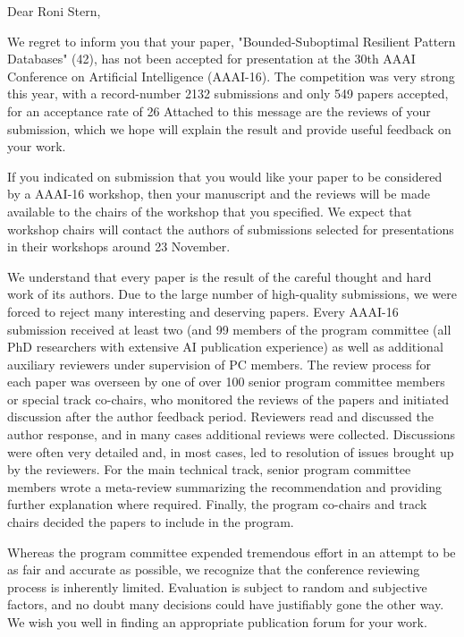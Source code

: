 Dear Roni Stern,

We regret to inform you that your paper, "Bounded-Suboptimal Resilient Pattern Databases" (42), has not been accepted for presentation
at the 30th AAAI Conference on Artificial Intelligence (AAAI-16). The competition was very strong this year,
with a record-number 2132 submissions and only 549 papers accepted, for an acceptance rate of 26%
Attached to this message are the reviews of your submission, which we hope will explain the result and
provide useful feedback on your work.

If you indicated on submission that you would like your paper to be considered by a AAAI-16 workshop,
then your manuscript and the reviews will be made available to the chairs of the workshop that you
specified. We expect that workshop chairs will contact the authors of submissions selected for presentations
in their workshops around 23 November.

We understand that every paper is the result of the careful thought and hard work of its authors. Due to the
large number of high-quality submissions, we were forced to reject many interesting and deserving papers.
Every AAAI-16 submission received at least two (and 99%
members of the program committee (all PhD researchers with extensive AI publication experience) as well
as additional auxiliary reviewers under supervision of PC members. The review process for each paper was
overseen by one of over 100 senior program committee members or special track co-chairs, who monitored
the reviews of the papers and initiated discussion after the author feedback period. Reviewers read and
discussed the author response, and in many cases additional reviews were collected. Discussions were often
very detailed and, in most cases, led to resolution of issues brought up by the reviewers. For the main
technical track, senior program committee members wrote a meta-review summarizing the
recommendation and providing further explanation where required. Finally, the program co-chairs and
track chairs decided the papers to include in the program.

Whereas the program committee expended tremendous effort in an attempt to be as fair and accurate as
possible, we recognize that the conference reviewing process is inherently limited. Evaluation is subject to
random and subjective factors, and no doubt many decisions could have justifiably gone the other way. We
wish you well in finding an appropriate publication forum for your work.

